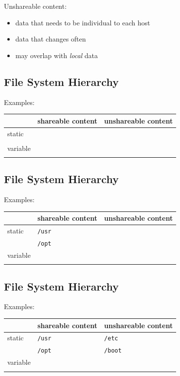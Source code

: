\documentclass[xga]{xdvislides}
\begin{document}
Unshareable content:
\begin{itemize}
	\item data that needs to be individual to each host
	\item data that changes often
	\item may overlap with {\em local} data
\end{itemize}

\subsection{File System Hierarchy}
Examples:
\\

\begin{center}
\begin{tabular}{| l | l | l |}
	\hline
	& shareable content & unshareable content \\
	\hline
	static   & & \\
	         & & \\
	\hline
	variable & & \\
	         & & \\
	\hline
\end{tabular}
\end{center}


\subsection{File System Hierarchy}
Examples:
\\

\begin{center}
\begin{tabular}{| l | l | l |}
	\hline
	& shareable content & unshareable content \\
	\hline
	static   & \verb+/usr+ & \\
	         & \verb+/opt+ & \\
	\hline
	variable & & \\
	         & & \\
	\hline
\end{tabular}
\end{center}

\subsection{File System Hierarchy}
Examples:
\\

\begin{center}
\begin{tabular}{| l | l | l |}
	\hline
	& shareable content & unshareable content \\
	\hline
	static   & \verb+/usr+ & \verb+/etc+ \\
	         & \verb+/opt+ & \verb+/boot+ \\
	\hline
	variable & & \\
	         & & \\
	\hline
\end{tabular}
\end{center}
\end{document}
